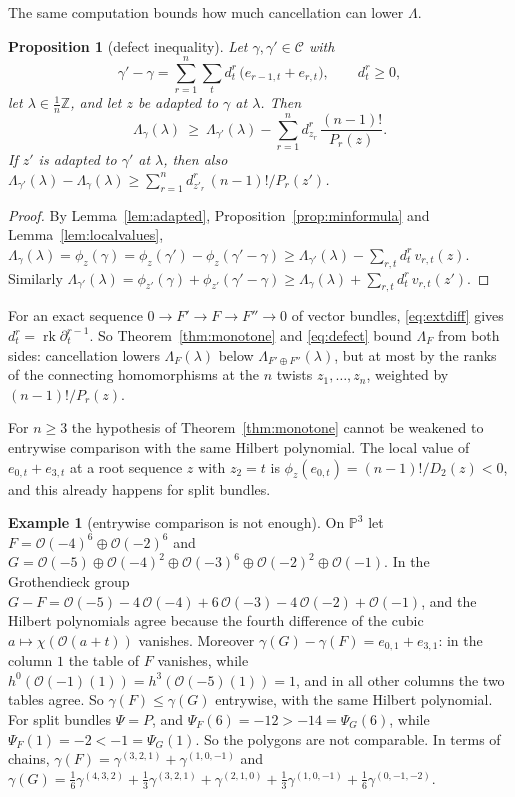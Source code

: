 \documentclass[11pt]{amsart}
\newtheorem{proposition}[theorem]{Proposition}
\theoremstyle{definition}
\newtheorem{example}[theorem]{Example}
\theoremstyle{remark}
\newcommand{\PP}{\mathbb{P}}
\newcommand{\ZZ}{\mathbb{Z}}
\newcommand{\OO}{\mathcal{O}}
\newcommand{\CC}{\mathcal{C}}
\DeclareMathOperator{\rk}{rk}
\begin{document}
The same computation bounds how much cancellation can lower $\Lambda$.

\begin{proposition}[defect inequality]\label{prop:defectineq}
Let $\gamma,\gamma'\in\CC$ with
\[
\gamma'-\gamma=\sum_{r=1}^n\sum_td^r_t\,\big(e_{r-1,t}+e_{r,t}\big),\qquad d^r_t\ge0 ,
\]
let $\lambda\in\frac1n\ZZ$, and let $z$ be adapted to $\gamma$ at $\lambda$. Then
\begin{equation}\label{eq:defect}
\Lambda_\gamma(\lambda)\ \ge\ \Lambda_{\gamma'}(\lambda)-\sum_{r=1}^nd^r_{z_r}\,\frac{(n-1)!}{P_r(z)}.
\end{equation}
If $z'$ is adapted to $\gamma'$ at $\lambda$, then also $\Lambda_{\gamma'}(\lambda)-\Lambda_\gamma(\lambda)\ge\sum_{r=1}^nd^r_{z'_r}\,(n-1)!/P_r(z')$.
\end{proposition}

\begin{proof}
By Lemma~\ref{lem:adapted}, Proposition~\ref{prop:minformula} and Lemma~\ref{lem:localvalues}, $\Lambda_\gamma(\lambda)=\phi_z(\gamma)=\phi_z(\gamma')-\phi_z(\gamma'-\gamma)\ge\Lambda_{\gamma'}(\lambda)-\sum_{r,t}d^r_t\,v_{r,t}(z)$. Similarly $\Lambda_{\gamma'}(\lambda)=\phi_{z'}(\gamma)+\phi_{z'}(\gamma'-\gamma)\ge\Lambda_\gamma(\lambda)+\sum_{r,t}d^r_t\,v_{r,t}(z')$.
\end{proof}

For an exact sequence $0\to F'\to F\to F''\to0$ of vector bundles, \eqref{eq:extdiff} gives $d^r_t=\rk\partial^{r-1}_t$. So Theorem~\ref{thm:monotone} and \eqref{eq:defect} bound $\Lambda_F$ from both sides: cancellation lowers $\Lambda_F(\lambda)$ below $\Lambda_{F'\oplus F''}(\lambda)$, but at most by the ranks of the connecting homomorphisms at the $n$ twists $z_1,\dots,z_n$, weighted by $(n-1)!/P_r(z)$.

For $n\ge3$ the hypothesis of Theorem~\ref{thm:monotone} cannot be weakened to entrywise comparison with the same Hilbert polynomial. The local value of $e_{0,t}+e_{3,t}$ at a root sequence $z$ with $z_2=t$ is $\phi_z(e_{0,t})=(n-1)!/D_2(z)<0$, and this already happens for split bundles.

\begin{example}[entrywise comparison is not enough]\label{ex:weak}
On $\PP^3$ let $F=\OO(-4)^{6}\oplus\OO(-2)^{6}$ and $G=\OO(-5)\oplus\OO(-4)^{2}\oplus\OO(-3)^{6}\oplus\OO(-2)^{2}\oplus\OO(-1)$. In the Grothendieck group $G-F=\OO(-5)-4\,\OO(-4)+6\,\OO(-3)-4\,\OO(-2)+\OO(-1)$, and the Hilbert polynomials agree because the fourth difference of the cubic $a\mapsto\chi(\OO(a+t))$ vanishes. Moreover $\gamma(G)-\gamma(F)=e_{0,1}+e_{3,1}$: in the column $1$ the table of $F$ vanishes, while $h^0(\OO(-1)(1))=h^3(\OO(-5)(1))=1$, and in all other columns the two tables agree. So $\gamma(F)\le\gamma(G)$ entrywise, with the same Hilbert polynomial. For split bundles $\Psi=P$, and $\Psi_F(6)=-12>-14=\Psi_G(6)$, while $\Psi_F(1)=-2<-1=\Psi_G(1)$. So the polygons are not comparable. In terms of chains, $\gamma(F)=\gamma^{(3,2,1)}+\gamma^{(1,0,-1)}$ and $\gamma(G)=\frac16\gamma^{(4,3,2)}+\frac13\gamma^{(3,2,1)}+\gamma^{(2,1,0)}+\frac13\gamma^{(1,0,-1)}+\frac16\gamma^{(0,-1,-2)}$.
\end{example}
\end{document}
